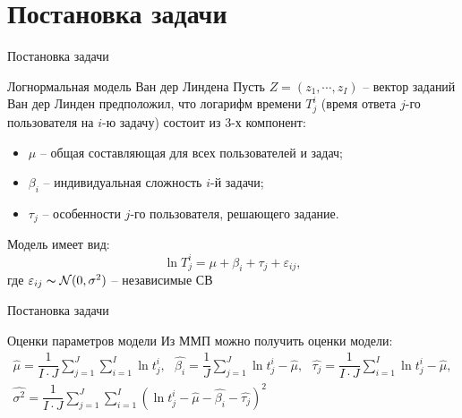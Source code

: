 \documentclass[aspectratio=169]{beamer}
\begin{document}
    \section{Постановка задачи}
    \begin{frame}{Постановка задачи}
        \begin{block}{Логнормальная модель Ван дер Линдена}
            Пусть $Z=(z_1,\cdots,z_I)$ -- вектор заданий\\
            Ван дер Линден предположил, что логарифм времени $T_j^i$ (время ответа $j$-го пользователя на $i$-ю задачу) состоит из 3-х компонент:
            \begin{itemize}
                \item $\mu$ -- общая составляющая для всех пользователей и задач;
                \item $\beta_i$ -- индивидуальная сложность $i$-й задачи;
                \item $\tau_j$ -- особенности $j$-го пользователя, решающего задание.
            \end{itemize}
            Модель имеет вид:
            \begin{equation}
            \ln T_j^i = \mu + \beta_i + \tau_j + \varepsilon_{ij},
            \end{equation}
            где $\varepsilon_{ij} \thicksim \mathcal{N}(0,\sigma^2)$ -- независимые СВ
        \end{block}
    \end{frame}

    \begin{frame}{Постановка задачи}
        \begin{block}{Оценки параметров модели}
            Из ММП можно получить оценки модели:
            \begin{gather}
                \hat{\mu} = \dfrac{1}{I \cdot J} \sum\limits_{j=1}^J \sum\limits_{i=1}^I \ln t_j^i, ~~~  \hat{\beta_i} = \dfrac{1}{J} \sum\limits_{j=1}^J \ln t_j^i - \hat{\mu}, ~~~  \hat{\tau_j} = \dfrac{1}{I \cdot J} \sum\limits_{i=1}^I \ln t_j^i - \hat{\mu},\\
                \hat{\sigma^2} = \dfrac{1}{I \cdot J} \sum\limits_{j=1}^J \sum\limits_{i=1}^I \left( \ln t_j^i - \hat{\mu} - \hat{\beta_i} - \hat{\tau_j} \right)^2
            \end{gather}
        \end{block}
    \end{frame}
\end{document}

